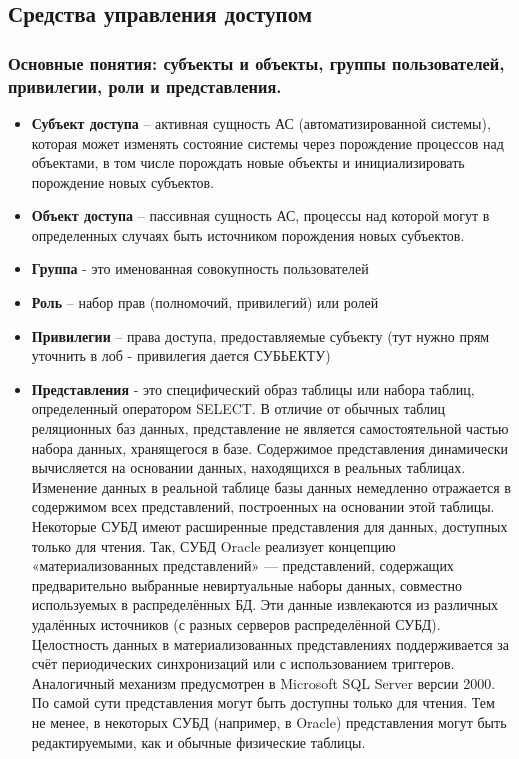 \subsection{Средства управления доступом}
\subsubsection{Основные понятия: субъекты и объекты, группы пользователей, привилегии, роли и представления.}

\begin{itemize}
    \item \textbf{Субъект доступа} – активная сущность АС (автоматизированной системы), которая может
        изменять состояние системы через порождение процессов над объектами, в том числе порождать
        новые объекты и инициализировать порождение новых субъектов.
    \item \textbf{Объект доступа} – пассивная сущность АС, процессы над которой могут в определенных случаях
        быть источником порождения новых субъектов.
    \item \textbf{Группа} - это именованная совокупность пользователей
    \item \textbf{Роль} – набор прав (полномочий, привилегий) или ролей
    \item \textbf{Привилегии} – права доступа, предоставляемые субъекту (тут нужно прям уточнить в лоб -
        привилегия дается СУБЬЕКТУ)
    \item \textbf{Представления} - это специфический образ таблицы или набора таблиц, определенный
        оператором SELECT. В отличие от обычных таблиц реляционных баз данных, представление не
        является самостоятельной частью набора данных, хранящегося в базе. Содержимое представления
        динамически вычисляется на основании данных, находящихся в реальных таблицах. Изменение
        данных в реальной таблице базы данных немедленно отражается в содержимом всех
        представлений, построенных на основании этой таблицы. Некоторые СУБД имеют расширенные
        представления для данных, доступных только для чтения.
        Так, СУБД Oracle реализует концепцию
        «материализованных представлений» — представлений, содержащих предварительно выбранные
        невиртуальные наборы данных, совместно используемых в распределённых БД. Эти данные
        извлекаются из различных удалённых источников (с разных серверов распределённой СУБД).
        Целостность данных в материализованных представлениях поддерживается за счёт периодических
        синхронизаций или с использованием триггеров. Аналогичный механизм предусмотрен в Microsoft
        SQL Server версии 2000. По самой сути представления могут быть доступны только для чтения.
        Тем не менее, в некоторых СУБД (например, в Oracle) представления могут быть редактируемыми,
        как и обычные физические таблицы.
\end{itemize}


